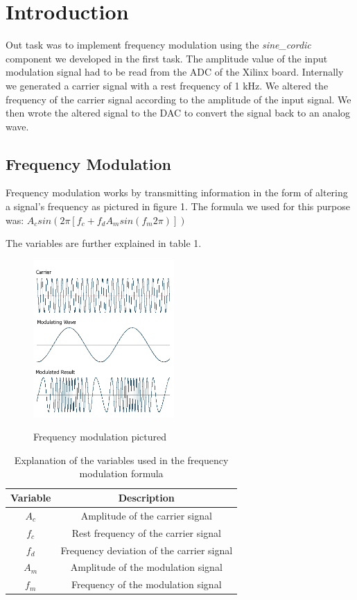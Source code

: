 \section{Introduction}
Out task was to implement frequency modulation using the \textit{sine\_cordic} component we developed in the first task. The amplitude value of the input modulation signal had to be read from the ADC of the Xilinx board. Internally we generated a carrier signal with a rest frequency of 1 kHz. We altered the frequency of the carrier signal according to the amplitude of the input signal. We then wrote the altered signal to the DAC to convert the signal back to an analog wave. 


\subsection{Frequency Modulation}

Frequency modulation works by transmitting information in the form of altering a signal's frequency as pictured in figure 1. The formula we used for this purpose was: $A_csin(2\pi[f_c+f_dA_msin(f_m2\pi)])$

The variables are further explained in table 1.

\begin{figure}[H] 
\centering %
{\includegraphics[height=6cm]{images/freq_mod.png}} %
\caption{Frequency modulation pictured} 
\label{fig:lorem} %
\end{figure} 

\begin{table}[H] 
	\begin{center}
		\begin{tabular}{ | c | c | }
			\hline
			\textbf{Variable} & \textbf{Description} \\
			\hline
			$A_c$ & Amplitude of the carrier signal \\
			$f_c$ & Rest frequency of the carrier signal \\
			$f_d$ & Frequency deviation of the carrier signal \\
			$A_m$ & Amplitude of the modulation signal \\
			$f_m$ & Frequency of the modulation signal \\
			\hline
		\end{tabular} 
	\end{center}	
	\caption{Explanation of the variables used in the frequency modulation formula} 
\end{table} 
	



